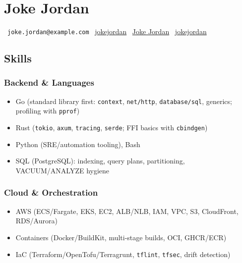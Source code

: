 \documentclass[
  10pt,
  a4paper,
]{extarticle}
\author{}
\date{}
\providecommand{\tightlist}{%
  \setlength{\itemsep}{0pt}\setlength{\parskip}{0pt}}
\begin{document}
\section{Joke Jordan}\label{joke-jordan}

\faEnvelope~\nolinkurl{joke.jordan@example.com} \textbar{}
\faGithub~\href{https://example.com}{jokejordan} \textbar{}
~\href{https://example.com}{Joke Jordan}
\textbar{}
~\href{https://example.com}{jokejordan}

\subsection{Skills}\label{skills}

\subsubsection{Backend \& Languages}\label{backend-languages}

\begin{itemize}
\tightlist
\item
  Go (standard library first: \texttt{context}, \texttt{net/http},
  \texttt{database/sql}, generics; profiling with \texttt{pprof})
\item
  Rust (\texttt{tokio}, \texttt{axum}, \texttt{tracing}, \texttt{serde};
  FFI basics with \texttt{cbindgen})
\item
  Python (SRE/automation tooling), Bash
\item
  SQL (PostgreSQL): indexing, query plans, partitioning, VACUUM/ANALYZE
  hygiene
\end{itemize}

\subsubsection{Cloud \& Orchestration}\label{cloud-orchestration}

\begin{itemize}
\tightlist
\item
  AWS (ECS/Fargate, EKS, EC2, ALB/NLB, IAM, VPC, S3, CloudFront,
  RDS/Aurora)
\item
  Containers (Docker/BuildKit, multi-stage builds, OCI, GHCR/ECR)
\item
  IaC (Terraform/OpenTofu/Terragrunt, \texttt{tflint}, \texttt{tfsec},
  drift detection)
\end{itemize}
\end{document}

